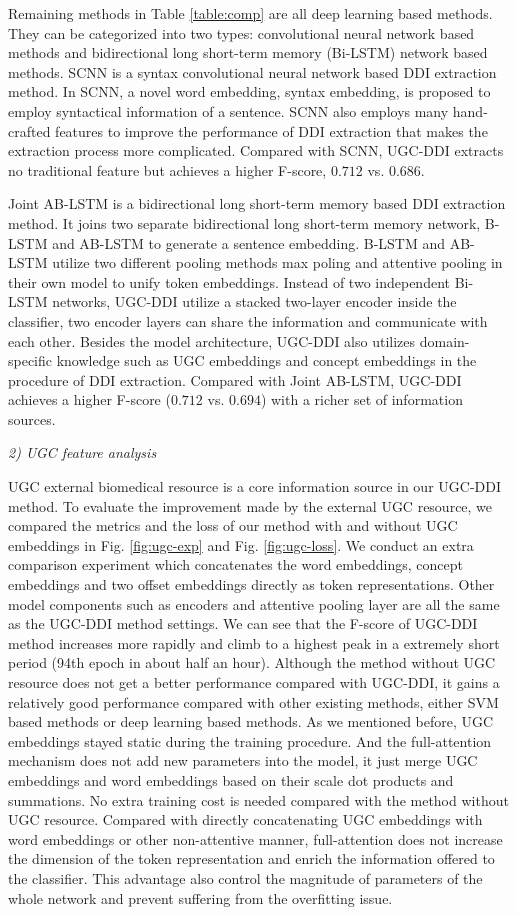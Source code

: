 \documentclass[conference]{IEEEtran}
\begin{document}
Remaining methods in Table \ref{table:comp} are all deep learning based methods.
They can be categorized into two types: convolutional neural network based methods and bidirectional long short-term memory (Bi-LSTM) network based methods.
SCNN \cite{zhao_drug_2016} is a syntax convolutional neural network based DDI extraction method.
In SCNN, a novel word embedding, syntax embedding, is proposed to employ syntactical information of a sentence.
SCNN also employs many hand-crafted features to improve the performance of DDI extraction that makes the extraction process more complicated.
Compared with SCNN, UGC-DDI extracts no traditional feature but achieves a higher F-score, $0.712$ vs. $0.686$.

Joint AB-LSTM is a bidirectional long short-term memory based DDI extraction method.
It joins two separate bidirectional long short-term memory network, B-LSTM and AB-LSTM to generate a sentence embedding.
B-LSTM and AB-LSTM utilize two different pooling methods max poling and attentive pooling in their own model to unify token embeddings.
Instead of two independent Bi-LSTM networks, UGC-DDI utilize a stacked two-layer encoder inside the classifier,
two encoder layers can share the information and communicate with each other.
Besides the model architecture, UGC-DDI also utilizes domain-specific knowledge such as UGC embeddings and concept embeddings
in the procedure of DDI extraction.
Compared with Joint AB-LSTM, UGC-DDI achieves a higher F-score ($0.712$ vs. $0.694$) with a richer set of information sources.

\bigbreak
\emph{2) UGC feature analysis}
\bigbreak

UGC external biomedical resource is a core information source in our UGC-DDI method.
To evaluate the improvement made by the external UGC resource, we compared the metrics and the loss of our method
with and without UGC embeddings in Fig. \ref{fig:ugc-exp} and Fig. \ref{fig:ugc-loss}.
We conduct an extra comparison experiment which concatenates the word embeddings, concept embeddings and two offset embeddings directly as token representations.
Other model components such as encoders and attentive pooling layer are all the same as the UGC-DDI method settings.
We can see that the F-score of UGC-DDI method increases more rapidly and climb to a highest peak in a extremely short period (94th epoch in about half an hour).
Although the method without UGC resource does not get a better performance compared with UGC-DDI,
it gains a relatively good performance compared with other existing methods, either SVM based methods or deep learning based methods.
As we mentioned before, UGC embeddings stayed static during the training procedure.
And the full-attention mechanism does not add new parameters into the model, it just merge UGC embeddings and word embeddings based on their
scale dot products and summations.
No extra training cost is needed compared with the method without UGC resource.
Compared with directly concatenating UGC embeddings with word embeddings or other non-attentive manner,
full-attention does not increase the dimension of the token representation and enrich the information offered to the classifier.
This advantage also control the magnitude of parameters of the whole network and prevent suffering from the overfitting issue.
\end{document}
